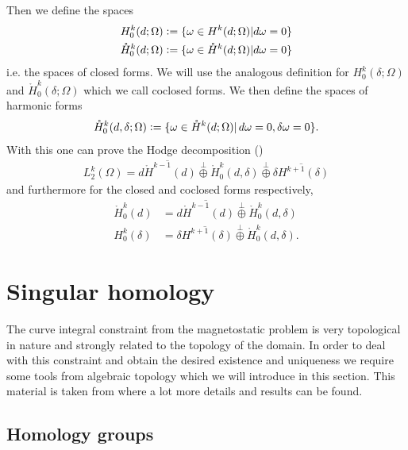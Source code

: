 \documentclass[12pt,a4paper]{article}
\numberwithin{equation}{subsection}
\numberwithin{lemma}{subsection}
\theoremstyle{definition}
\begin{document}
Then we define the spaces 
\begin{align*}
    H^k_0(d;\Omega) &\vcentcolon= \{ \omega \in H^k(d;\Omega) 
    | d\omega = 0 \} \\
    \mathring{H}^k_0(d;\Omega) &\vcentcolon= \{ \omega \in \mathring{H}^k(d;\Omega) 
    | d\omega = 0 \}
\end{align*}
i.e. the spaces of closed forms. We will use the analogous definition for 
$H^k_0(\delta;\Omega)$ and $\mathring{H}^k_0(\delta;\Omega)$ which we call 
coclosed forms. We then define the spaces of harmonic forms
\begin{align*}
    \mathring{H}^k_0(d,\delta;\Omega) \vcentcolon= 
    \{ \omega \in \mathring{H}^k(d;\Omega) 
    | \, d\omega = 0, \delta\omega = 0 \}.
\end{align*}
With this one can prove the Hodge decomposition (\cite[Lemma 1]{arnold})
\begin{align}
    L_2^k(\Omega) = \overline{d\mathring{H}^{k-1}(d)} \stackrel{\perp}{\oplus} 
    \mathring{H}^k_0(d,\delta) \stackrel{\perp}{\oplus} 
    \overline{\delta H^{k+1}(\delta)} \label{hodge_decomposition}
\end{align}
and furthermore for the closed and coclosed forms respectively,
\begin{align}
    \mathring{H}^k_0(d) &= \overline{d\mathring{H}^{k-1}(d)} 
    \stackrel{\perp}{\oplus}
    \mathring{H}^k_0(d,\delta) \label{decomposition_closed_forms} \\
    H^k_0(\delta) &= \overline{\delta H^{k+1}(\delta)} \stackrel{\perp}{\oplus}
    \mathring{H}^k_0(d,\delta). \label{decomposition_coclosed_forms}
\end{align}

\section{Singular homology}

The curve integral constraint from the magnetostatic problem is very topological %
in nature and strongly related to the topology of the domain. 
In order to deal with this constraint and obtain the desired existence and
uniqueness we require some tools from algebraic topology which we will introduce 
in this section. 
This material is taken from
\cite{topology_and_geometry} where a lot more details and results can be found.

\subsection{Homology groups}
\end{document}
